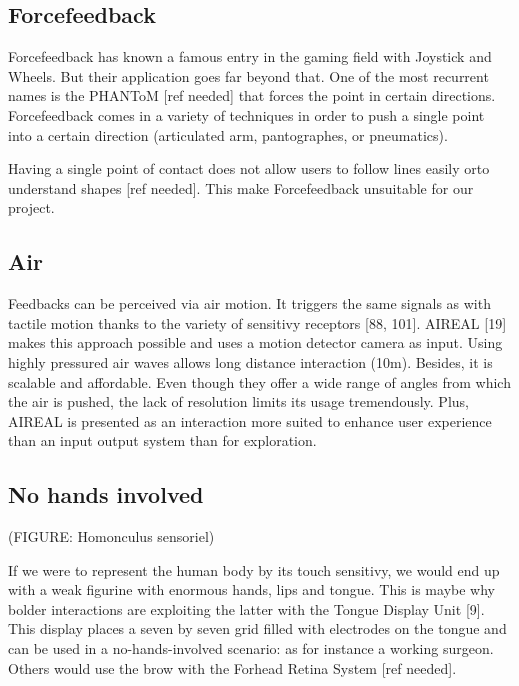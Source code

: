 \subsection{Forcefeedback}\label{forcefeedback}

Forcefeedback has known a famous entry in the gaming field with Joystick
and Wheels. But their application goes far beyond that. One of the most
recurrent names is the PHANToM {[}ref needed{]} that forces the point in
certain directions. Forcefeedback comes in a variety of techniques in
order to push a single point into a certain direction (articulated arm,
pantographes, or pneumatics).

Having a single point of contact does not allow users to follow lines
easily orto understand shapes {[}ref needed{]}. This make Forcefeedback
unsuitable for our project.

\subsection{Air}\label{air}

Feedbacks can be perceived via air motion. It triggers the same signals
as with tactile motion thanks to the variety of sensitivy receptors
{[}88, 101{]}. AIREAL {[}19{]} makes this approach possible and uses a
motion detector camera as input. Using highly pressured air waves allows
long distance interaction (10m). Besides, it is scalable and affordable.
Even though they offer a wide range of angles from which the air is
pushed, the lack of resolution limits its usage tremendously. Plus,
AIREAL is presented as an interaction more suited to enhance user
experience than an input output system than for exploration.

\subsection{No hands involved}\label{no-hands-involved}

(FIGURE: Homonculus sensoriel)

If we were to represent the human body by its touch sensitivy, we would
end up with a weak figurine with enormous hands, lips and tongue. This
is maybe why bolder interactions are exploiting the latter with the
Tongue Display Unit {[}9{]}. This display places a seven by seven grid
filled with electrodes on the tongue and can be used in a
no-hands-involved scenario: as for instance a working surgeon. Others
would use the brow with the Forhead Retina System {[}ref needed{]}.

